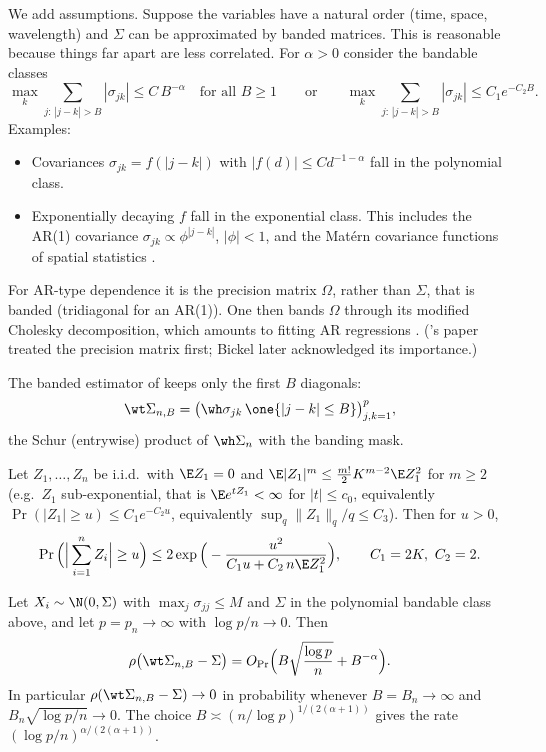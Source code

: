We add assumptions. Suppose the variables have a natural order (time, space, wavelength) and \(\Sigma\) can be approximated by banded matrices. This is reasonable because things far apart are less correlated. For \(\alpha > 0\) consider the bandable classes
\begin{equation*}
\max_k \sum_{j:\, |j-k| > B} |\sigma_{jk}| \le C\, B^{-\alpha} \quad\text{for all } B \ge 1
\qquad\text{or}\qquad
\max_k \sum_{j:\, |j-k| > B} |\sigma_{jk}| \le C_1 e^{-C_2 B}.
\end{equation*}
Examples:
\begin{itemize}
\item Covariances \(\sigma_{jk} = f(|j-k|)\) with \(|f(d)| \le C d^{-1-\alpha}\) fall in the polynomial class.
\item Exponentially decaying \(f\) fall in the exponential class. This includes the AR(1) covariance \(\sigma_{jk} \propto \phi^{|j-k|}\), \(|\phi| < 1\), and the Mat\'ern covariance functions of spatial statistics \citep{Ste99}.
\end{itemize}

For AR-type dependence it is the precision matrix \(\Omega\), rather than \(\Sigma\), that is banded (tridiagonal for an AR(1)). One then bands \(\Omega\) through its modified Cholesky decomposition, which amounts to fitting AR regressions \citep{WP03,BL08a}. (\citeauthor{WP03}'s \citeyear{WP03} paper treated the precision matrix first; Bickel later acknowledged its importance.)

The banded estimator of \citet{BL08a} keeps only the first \(B\) diagonals:
\[\wt\Sigma_{n,B} = \big(\wh\sigma_{jk}\, \one\{|j-k| \le B\}\big)_{j,k=1}^p,\]
the Schur (entrywise) product of \(\wh\Sigma_n\) with the banding mask.

\begin{lemma}\label{lmm:bernstein}
Let \(Z_1, \dots, Z_n\) be i.i.d.\ with \(\E Z_1 = 0\) and \(\E|Z_1|^m \le \frac{m!}{2} K^{m-2} \E Z_1^2\) for \(m \ge 2\) (e.g.\ \(Z_1\) sub-exponential, that is \(\E e^{tZ_1} < \infty\) for \(|t| \le c_0\), equivalently \(\Pr(|Z_1| \ge u) \le C_1 e^{-C_2 u}\), equivalently \(\sup_q \|Z_1\|_q / q \le C_3\)). Then for \(u > 0\),
\[\Pr\Big(\Big|\sum_{i=1}^n Z_i\Big| \ge u\Big) \le 2\exp\Big(-\frac{u^2}{C_1 u + C_2\, n \E Z_1^2}\Big), \qquad C_1 = 2K,\ C_2 = 2.\]
\end{lemma}

\begin{theorem}[\citet{BL08a}]\label{thm:band}
Let \(X_i \sim \N(0, \Sigma)\) with \(\max_j \sigma_{jj} \le M\) and \(\Sigma\) in the polynomial bandable class above, and let \(p = p_n \to \infty\) with \(\log p / n \to 0\). Then
\[\rho\big(\wt\Sigma_{n,B} - \Sigma\big) = O_{\Pr}\Big(B \sqrt{\frac{\log p}{n}} + B^{-\alpha}\Big).\]
In particular \(\rho(\wt\Sigma_{n,B} - \Sigma) \to 0\) in probability whenever \(B = B_n \to \infty\) and \(B_n \sqrt{\log p / n} \to 0\). The choice \(B \asymp (n/\log p)^{1/(2(\alpha+1))}\) gives the rate \((\log p / n)^{\alpha/(2(\alpha+1))}\).
\end{theorem}

